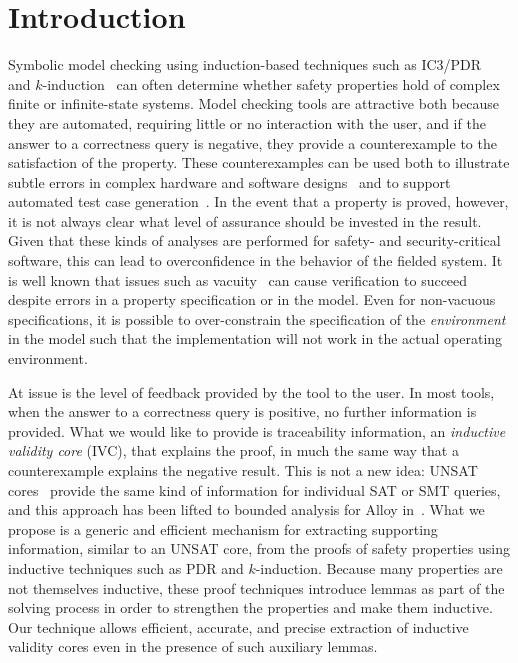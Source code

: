 \section{Introduction}
\label{sec:intro}


Symbolic model checking using induction-based techniques such as IC3/PDR~\cite{Een2011:PDR} and $k$-induction~\cite{SheeranSS00} can often determine whether safety properties hold of complex finite or infinite-state systems.  Model checking tools are attractive both because they are automated, requiring little or no interaction with the user, and if the answer to a correctness query is negative, they provide a counterexample to the satisfaction of the property.  These counterexamples can be used both to illustrate subtle errors in complex hardware and software designs~\cite{hilt2013,McMillan99:compositional, Miller10:CACM} and to support automated test case generation~\cite{Whalen13:OMCDC, You15:dse}.
In the event that a property is proved, however, it is not always clear what level of assurance should be invested in the result.  Given that these kinds of analyses are performed for safety- and security-critical software, this can lead to overconfidence in the behavior of the fielded system.  It is well known that issues such as vacuity~\cite{Kupferman03:Vacuity} can cause verification to succeed despite errors in a property specification or in the model. Even for non-vacuous specifications, it is possible to over-constrain the specification of the {\em environment} in the model such that the implementation will not work in the actual operating environment.

At issue is the level of feedback provided by the tool to the user. In
most tools, when the answer to a correctness query is positive, no
further information is provided. What we would like to provide is
traceability information, an {\em inductive validity core} (IVC), that explains
the proof, in much the same way that a counterexample explains the
negative result. This is not a new idea: UNSAT cores~\cite{zhang2003extracting}
provide the same kind of information for individual SAT or
SMT queries, and this approach has been lifted to bounded analysis
for Alloy in~\cite{Torlak08:cores}. What we propose is a generic and efficient
mechanism for extracting supporting information, similar to an UNSAT
core, from the proofs of safety properties using inductive techniques
such as PDR and $k$-induction. Because many
properties are not themselves inductive, these proof techniques
introduce lemmas as part of the solving process in order to strengthen
the properties and make them inductive. Our technique allows
efficient, accurate, and precise extraction of inductive validity cores
even in the presence of such auxiliary lemmas.

